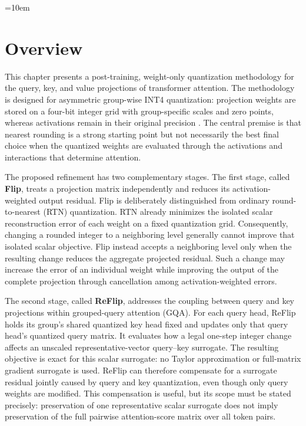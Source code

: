 \sloppy
\emergencystretch=10em
\section{Overview}

This chapter presents a post-training, weight-only quantization methodology for the query, key, and value projections of transformer attention. The methodology is designed for asymmetric group-wise INT4 quantization: projection weights are stored on a four-bit integer grid with group-specific scales and zero points, whereas activations remain in their original precision \cite{jacob2018quantization,nagel2021white}. The central premise is that nearest rounding is a strong starting point but not necessarily the best final choice when the quantized weights are evaluated through the activations and interactions that determine attention.

The proposed refinement has two complementary stages. The first stage, called \textbf{Flip}, treats a projection matrix independently and reduces its activation-weighted output residual. Flip is deliberately distinguished from ordinary round-to-nearest (RTN) quantization. RTN already minimizes the isolated scalar reconstruction error of each weight on a fixed quantization grid. Consequently, changing a rounded integer to a neighboring level generally cannot improve that isolated scalar objective. Flip instead accepts a neighboring level only when the resulting change reduces the aggregate projected residual. Such a change may increase the error of an individual weight while improving the output of the complete projection through cancellation among activation-weighted errors.

The second stage, called \textbf{ReFlip}, addresses the coupling between query and key projections within grouped-query attention (GQA). For each query head, ReFlip holds its group's shared quantized key head fixed and updates only that query head's quantized query matrix. It evaluates how a legal one-step integer change affects an unscaled representative-vector query--key surrogate. The resulting objective is exact for this scalar surrogate: no Taylor approximation or full-matrix gradient surrogate is used. ReFlip can therefore compensate for a surrogate residual jointly caused by query and key quantization, even though only query weights are modified. This compensation is useful, but its scope must be stated precisely: preservation of one representative scalar surrogate does not imply preservation of the full pairwise attention-score matrix over all token pairs.

